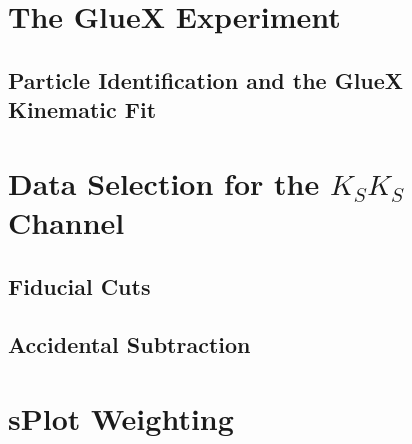 \section{The GlueX Experiment}\label{sec:the-gluex-experiment}

\subsection{Particle Identification and the GlueX Kinematic Fit}\label{sub:particle-identification-and-the-gluex-kinematic-fit}

\section{Data Selection for the $K_SK_S$ Channel}\label{sec:data-selection}

\subsection{Fiducial Cuts}\label{sub:fiducial-cuts}

\subsection{Accidental Subtraction}\label{sub:accidental-subtraction}

\section{sPlot Weighting}\label{sec:splot}

